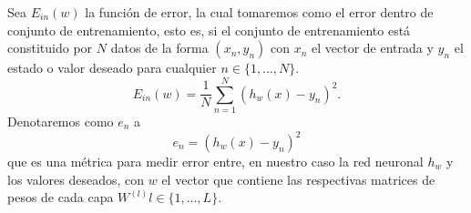 Sea $E_{in}(w)$ la función de error, la cual tomaremos como el error dentro de conjunto de entrenamiento, esto es,  si el conjunto 
de entrenamiento está constituido por $N$ datos de la forma $(x_n, y_n)$ con $x_n$ el vector de entrada y $y_n$ el estado o valor deseado para cualquier $n\in \{1, \ldots, N\}.$
\begin{equation}
    E_{in}(w) = \frac{1}{N} \sum^N_{n=1} (h_w(x)- y_n)^2. 
\end{equation}
Denotaremos como $e_n$ a 
\begin{equation}
    e_n = (h_w(x)- y_n)^2 
\end{equation}
que es una métrica para medir error entre, en nuestro caso  
la red neuronal $h_w$ y los valores deseados, con $w$ el vector que contiene las respectivas matrices de pesos de cada capa 
$W^{(l)} l \in \{1, \ldots, L\}.$  

